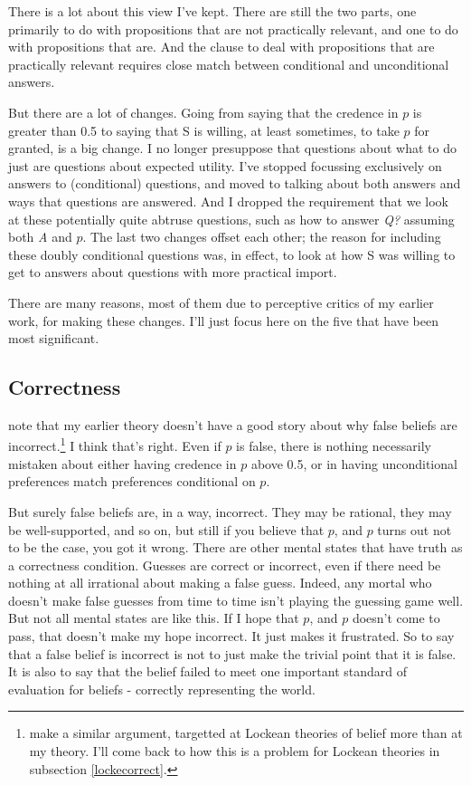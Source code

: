 \documentclass[11pt,]{book}
\let\rmarkdownfootnote\footnote%
\def\footnote{\protect\rmarkdownfootnote}
\begin{document}
There is a lot about this view I've kept. There are still the two parts, one primarily to do with propositions that are not practically relevant, and one to do with propositions that are. And the clause to deal with propositions that are practically relevant requires close match between conditional and unconditional answers.

But there are a lot of changes. Going from saying that the credence in \(p\) is greater than 0.5 to saying that S is willing, at least sometimes, to take \(p\) for granted, is a big change. I no longer presuppose that questions about what to do just are questions about expected utility. I've stopped focussing exclusively on answers to (conditional) questions, and moved to talking about both answers and ways that questions are answered. And I dropped the requirement that we look at these potentially quite abtruse questions, such as how to answer \emph{Q?} assuming both \emph{A} and \(p\). The last two changes offset each other; the reason for including these doubly conditional questions was, in effect, to look at how S was willing to get to answers about questions with more practical import.

There are many reasons, most of them due to perceptive critics of my earlier work, for making these changes. I'll just focus here on the five that have been most significant.

\hypertarget{mecorrect}{%
\subsection{Correctness}\label{mecorrect}}

\citet{RossSchroeder2014} note that my earlier theory doesn't have a good story about why false beliefs are incorrect.\footnote{\citet{FantlMcGrath2009} make a similar argument, targetted at Lockean theories of belief more than at my theory. I'll come back to how this is a problem for Lockean theories in subsection \ref{lockecorrect}.} I think that's right. Even if \(p\) is false, there is nothing necessarily mistaken about either having credence in \(p\) above 0.5, or in having unconditional preferences match preferences conditional on \(p\).

But surely false beliefs are, in a way, incorrect. They may be rational, they may be well-supported, and so on, but still if you believe that \(p\), and \(p\) turns out not to be the case, you got it wrong. There are other mental states that have truth as a correctness condition. Guesses are correct or incorrect, even if there need be nothing at all irrational about making a false guess. Indeed, any mortal who doesn't make false guesses from time to time isn't playing the guessing game well. But not all mental states are like this. If I hope that \(p\), and \(p\) doesn't come to pass, that doesn't make my hope incorrect. It just makes it frustrated. So to say that a false belief is incorrect is not to just make the trivial point that it is false. It is also to say that the belief failed to meet one important standard of evaluation for beliefs - correctly representing the world.
\end{document}
